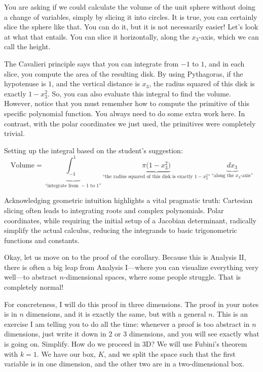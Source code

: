 \begin{spoken-clean}[18:38 - 21:05]
You are asking if we could calculate the volume of the unit sphere without doing a change of variables, simply by slicing it into circles. It is true, you can certainly slice the sphere like that. You can do it, but it is not necessarily easier! Let's look at what that entails. You can slice it horizontally, along the $x_3$-axis, which we can call the height. 

The Cavalieri principle says that you can integrate from $-1$ to $1$, and in each slice, you compute the area of the resulting disk. By using Pythagoras, if the hypotenuse is $1$, and the vertical distance is $x_3$, the radius squared of this disk is exactly $1 - x_3^2$. So, you can also evaluate this integral to find the volume. However, notice that you must remember how to compute the primitive of this specific polynomial function. You always need to do some extra work here. In contrast, with the polar coordinates we just used, the primitives were completely trivial.
\end{spoken-clean}

\begin{math-stroke}
Setting up the integral based on the student's suggestion:
\[
\text{Volume} = \underbrace{\int_{-1}^{1}}_{\text{``integrate from } -1 \text{ to } 1 \text{''}} \underbrace{\pi \big(1 - x_3^2\big)}_{\text{``the radius squared of this disk is exactly } 1 - x_3^2 \text{''}} \, \underbrace{dx_3}_{\text{``along the } x_3 \text{-axis''}}
\]
\end{math-stroke}

\begin{didactic-insight}
Acknowledging geometric intuition highlights a vital pragmatic truth: Cartesian slicing often leads to integrating roots and complex polynomials. Polar coordinates, while requiring the initial setup of a Jacobian determinant, radically simplify the actual calculus, reducing the integrands to basic trigonometric functions and constants.
\end{didactic-insight}

\begin{spoken-clean}[21:05 - 24:15]
Okay, let us move on to the proof of the corollary. Because this is Analysis II, there is often a big leap from Analysis I—where you can visualize everything very well—to abstract $n$-dimensional spaces, where some people struggle. That is completely normal! 

For concreteness, I will do this proof in three dimensions. The proof in your notes is in $n$ dimensions, and it is exactly the same, but with a general $n$. This is an exercise I am telling you to do all the time: whenever a proof is too abstract in $n$ dimensions, just write it down in 2 or 3 dimensions, and you will see exactly what is going on. Simplify. How do we proceed in 3D? We will use Fubini's theorem with $k = 1$. We have our box, $K$, and we split the space such that the first variable is in one dimension, and the other two are in a two-dimensional box.
\end{spoken-clean}

